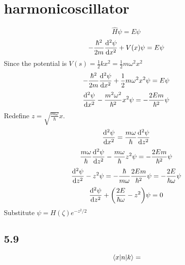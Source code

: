 \section*{harmonicoscillator}

\[\hat{H}\psi=E\psi\]
\[-\frac{\hbar^2}{2m}\dv[2]{\psi}{x}+V(x)\psi=E\psi\]
Since the potential is $V(s)=\frac{1}{2}kx^2=\frac{1}{2}m\omega^2x^2$
\[-\frac{\hbar^2}{2m}\dv[2]{\psi}{x}+\frac{1}{2}m\omega^2x^2\psi=E\psi\]
\[\dv[2]{\psi}{x}-\frac{m^2\omega^2}{\hbar^2}x^2\psi=-\frac{2Em}{\hbar^2}\psi\]
Redefine $z=\sqrt{\frac{m\omega}{\hbar}}x$.
\[\dv[2]{\psi}{x}=\frac{m\omega}{\hbar}\dv[2]{\psi}{z}\]
\[\frac{m\omega}{\hbar}\dv[2]{\psi}{z}-\frac{m\omega}{\hbar}z^2\psi=-\frac{2Em}{\hbar^2}\psi\]
\[\dv[2]{\psi}{z}-z^2\psi=-\frac{\hbar}{m\omega}\frac{2Em}{\hbar^2}\psi=-\frac{2E}{\hbar\omega}\psi\]
\[\dv[2]{\psi}{z}+\qty(\frac{2E}{\hbar\omega}-z^2)\psi=0\]
Substitute $\psi=H(\zeta)e^{-z^2/2}$	
\subsection*{5.9}
\[\mel{x}{n}{k}=\]
